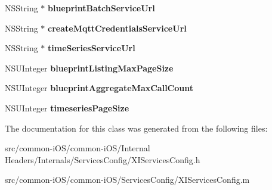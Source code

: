 \begin{DoxyCompactItemize}
\item 
\hypertarget{interface_x_i_services_config_a185882930145ae1a2b254c327f4b5f10}{}\label{interface_x_i_services_config_a185882930145ae1a2b254c327f4b5f10} 
N\+S\+String $\ast$ {\bfseries blueprint\+Batch\+Service\+Url}
\item 
\hypertarget{interface_x_i_services_config_a549ec7c74352c09295352f8cc0487f80}{}\label{interface_x_i_services_config_a549ec7c74352c09295352f8cc0487f80} 
N\+S\+String $\ast$ {\bfseries create\+Mqtt\+Credentials\+Service\+Url}
\item 
\hypertarget{interface_x_i_services_config_ac911b08211012020ac3bc7238e4b1890}{}\label{interface_x_i_services_config_ac911b08211012020ac3bc7238e4b1890} 
N\+S\+String $\ast$ {\bfseries time\+Series\+Service\+Url}
\item 
\hypertarget{interface_x_i_services_config_a460b23cd5cb93257575c89b246f5335a}{}\label{interface_x_i_services_config_a460b23cd5cb93257575c89b246f5335a} 
N\+S\+U\+Integer {\bfseries blueprint\+Listing\+Max\+Page\+Size}
\item 
\hypertarget{interface_x_i_services_config_aaadfce32c7220d04b8292c419501c81f}{}\label{interface_x_i_services_config_aaadfce32c7220d04b8292c419501c81f} 
N\+S\+U\+Integer {\bfseries blueprint\+Aggregate\+Max\+Call\+Count}
\item 
\hypertarget{interface_x_i_services_config_a53740780e55b19490280e771003335ce}{}\label{interface_x_i_services_config_a53740780e55b19490280e771003335ce} 
N\+S\+U\+Integer {\bfseries timeseries\+Page\+Size}
\end{DoxyCompactItemize}


The documentation for this class was generated from the following files\+:\begin{DoxyCompactItemize}
\item 
src/common-\/i\+O\+S/common-\/i\+O\+S/\+Internal Headers/\+Internals/\+Services\+Config/X\+I\+Services\+Config.\+h\item 
src/common-\/i\+O\+S/common-\/i\+O\+S/\+Services\+Config/X\+I\+Services\+Config.\+m\end{DoxyCompactItemize}
